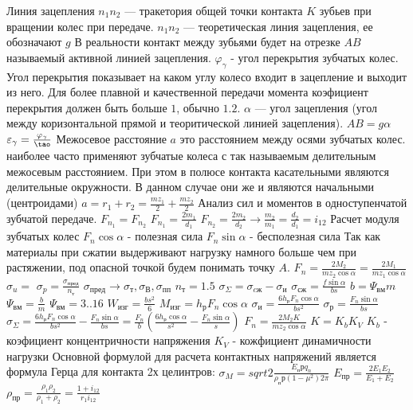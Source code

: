 \documentclass{article}
\begin{document}
Линия зацепления $n_1n_2$ --- тракетория общей точки контакта $K$ зубьев при вращении колес при передаче.
$n_1n_2$ --- теоретическая линия зацепления, ее обозначают $g$
В реальности контакт между зубьями будет на отрезке $AB$ называемый активной линией зацепления.
$\varphi_{\gamma}$ - угол перекрытия зубчатых колес.
Угол перекрытия показывает на каком углу колесо входит в зацепление и выходит из него.
Для более плавной и качественной передачи момента коэфициент перекрытия должен быть больше $1$, обычно $1.2$.
$\alpha$ --- угол зацепления (угол между коризонтальной прямой и теоритической линией зацепления).
$AB = g\alpha$
$\varepsilon_{\gamma}=\frac{\varphi_{\gamma}}{\tao}$
Межосевое расстояние $a$ это расстоянием между осями зубчатых колес. наиболее часто применяют зубчатые колеса с так называемым делительным межосевым расстоянием. При этом в полюсе контакта касательными являются делительные окружности.
В данном случае они же и являются начальными (центроидами)
$a = r_1 + r_2 = \frac{mz_1}{2} + \frac{mz_2}{2}$
Анализ сил и моментов в одноступенчатой зубчатой передаче.
$F_{n_1} = F_{n_2}$
$F_{n_1} = \frac{2m_1}{d_1}$
$F_{n_2} = \frac{2m_2}{d_2} \to \frac{m_2}{m_1} = \frac{d_2}{d_1}=i_{12}$
Расчет модуля зубчатых колес
$F_n \cos{\alpha}$ - полезная сила
$F_n \sin{\alpha}$ - бесполезная сила  
Так как материалы при сжатии выдерживают нагрузку намного больше чем при растяжении, под опасной точкой будем понимать точку $A$.
$F_n = \frac{2M_2}{mz_2\cos{\alpha}} = \frac{2M_1}{mz_1\cos{\alpha}}$
$\sigma_u = $
$\sigma_p = \frac{\sigma_{пред}}{n_т}$ 
$\sigma_{пред} \to \sigma_т,\sigma_В,\sigma_{пп}$
$n_т = 1.5$
$\sigma_\Sigma = \sigma_{cж} - \sigma_{и}$
$\sigma_{сж} = \frac{f\sin{\alpha}}{bs}$
$b = \Psi_{вм}m$
$\Psi_{вм} = \frac{b}{m}$
$\Psi_{вм} = 3..16$
$W_{изг} = \frac{bs^2}{6}$
$M_{изг} = h_рF_n\cos{\alpha}$
$\sigma_и = \frac{6h_рF_n\cos{\alpha}}{bs^2}$
$\sigma_р = \frac{F_n\sin{\alpha}}{bs}$
$\sigma_{\Sigma} = \frac{6h_рF_n\cos{\alpha}}{bs^2} - \frac{F_n\sin{\alpha}}{bs} = \frac{F_n}{b}(\frac{6h_р\cos{\alpha}}{s^2} - \frac{F_n\sin{\alpha}}{s})$
$F_n = \frac{2M_2K}{mz_2\cos{\alpha}}$
$K = K_bK_V$
$K_b$ - коэфициент концентричности напряжения
$K_V$ - кожфициент динамичности нагрузки
Основной формулой для расчета контактных напряжений является формула Герца для контакта 2х целинтров:
$\sigma_M=sqrt{2}{\frac{E_прq_n}{\rho_пр(1-\mu^2)2\pi}}$
$E_{пр} = \frac{2E_1E_2}{E_1 + E_2}$
$\rho_{пр} = \frac{\rho_1\rho_2}{\rho_1 + \rho_2} = \frac{1 + i_{12}}{r_1i_{12}}$%
\end{document}

